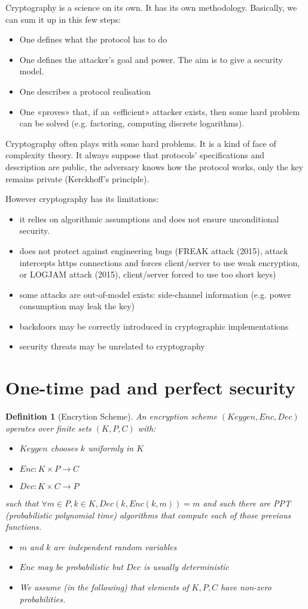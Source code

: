 \documentclass{article}
\newtheorem{defi}[thm]{Definition}
\newcommand{\Def}[3]{\begin{defi}[#1]\label{#2}#3\end{defi}}
\begin{document}
Cryptography is a science on its own. It has its own methodology. Basically, we can sum it up in this few steps:
\begin{itemize}
\item One defines what the protocol has to do
\item One defines the attacker's goal and power. The aim is to give a security model.
\item One describes a protocol realisation
\item One «proves» that, if an «efficient» attacker exists, then some hard problem can be solved (e.g. factoring, computing discrete logarithms).
\end{itemize}

Cryptography often plays with some hard problems. It is a kind of face of complexity theory. It always suppose that protocols' specifications and description are public, the adversary knows how the protocol works, only the key remains private (Kerckhoff's principle).

However cryptography has its limitations:
\begin{itemize}
\item it relies on algorithmic assumptions and does not ensure unconditional security.
\item does not protect against engineering bugs (FREAK attack (2015), attack intercepts https connections and forces client/server to use weak encryption, or LOGJAM attack (2015), client/server forced to use too short keys)
\item some attacks are out-of-model exists: side-channel information (e.g. power consumption may leak the key)
\item backdoors may be correctly introduced in cryptographic implementations
\item security threats may be unrelated to cryptography
\end{itemize}

\section{One-time pad and perfect security}
\Def{Encrytion Scheme}{def:encrysch}{An encryption scheme $(Keygen, Enc, Dec)$ operates over finite sets $(K,P,C)$ with:
\begin{itemize}
\item $Keygen$ chooses $k$ uniformly in $K$
\item $Enc : K\times P \rightarrow C$
\item $Dec : K\times C \rightarrow P$
\end{itemize}
such that $\forall m\in P, k\in K, Dec(k,Enc(k,m))=m$ and such there are PPT (probabilistic polynomial time) algorithms that compute each of those previous functions.
\begin{itemize}
\item $m$ and $k$ are independent random variables
\item $Enc$ may be probabilistic but $Dec$ is usually deterministic
\item We assume (in the following) that elements of $K,P,C$ have non-zero probabilities.
\end{itemize}}
\end{document}

